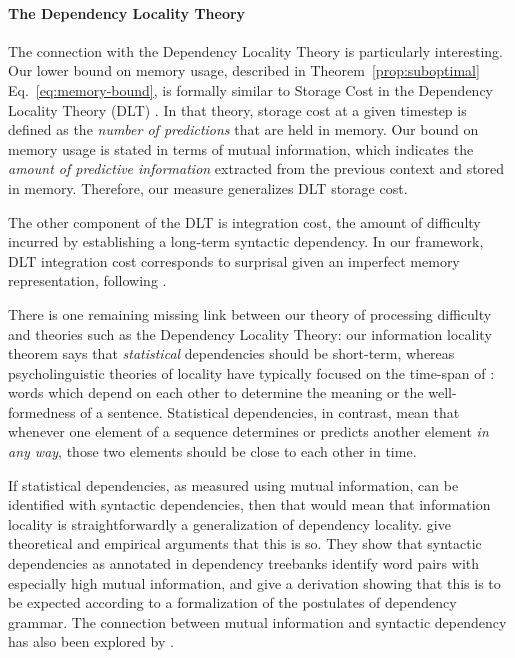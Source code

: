 \paragraph{The Dependency Locality Theory}
The connection with the Dependency Locality Theory is particularly interesting.
Our lower bound on memory usage, described in Theorem~\ref{prop:suboptimal} Eq.~\ref{eq:memory-bound}, is formally similar to Storage Cost in the Dependency Locality Theory (DLT) \citep{gibson-linguistic-1998,gibson2000dependency}.
In that theory, storage cost at a given timestep is defined as the \emph{number of predictions} that are held in memory.
Our bound on memory usage is stated in terms of mutual information, which indicates the \emph{amount of predictive information} extracted from the previous context and stored in memory.
Therefore, our measure generalizes DLT storage cost.


The other component of the DLT is integration cost, the amount of difficulty incurred by establishing a long-term syntactic dependency. 
In our framework, DLT integration cost corresponds to surprisal given an imperfect memory representation, following \cite{futrell2020lossy}.

There is one remaining missing link between our theory of processing difficulty and theories such as the Dependency Locality Theory:
our information locality theorem says that \emph{statistical} dependencies should be short-term, whereas psycholinguistic theories of locality have typically focused on the time-span of : words which depend on each other to determine the meaning or the well-formedness of a sentence. Statistical dependencies, in contrast, mean that whenever one element of a sequence determines or predicts another element \emph{in any way}, those two elements should be close to each other in time. 

If statistical dependencies, as measured using mutual information, can be identified with syntactic dependencies, then that would mean that information locality is straightforwardly a generalization of dependency locality. \citet{futrell2019syntactic} give theoretical and empirical arguments that this is so. They show that syntactic dependencies as annotated in dependency treebanks identify word pairs with especially high mutual information, and give a derivation showing that this is to be expected according to a formalization of the postulates of dependency grammar. The connection between mutual information and syntactic dependency has also been explored by \citet{de1996selection, yuret1998discovery}. %


